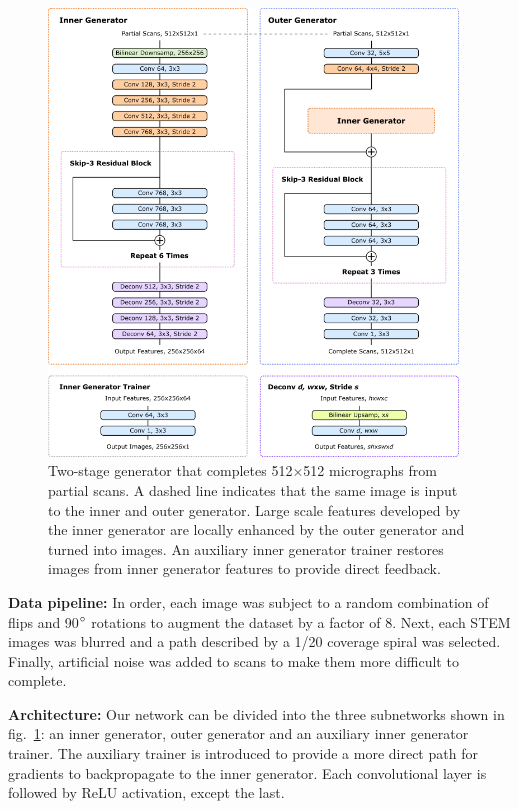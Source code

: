 \documentclass[letterpaper, 10 pt, conference]{ieeeconf}  %
\newcommand\extraspace{3pt}
\begin{document}
\begin{figure}[tbp!]
\vspace{1.5cm}
\centering
\includegraphics[width=0.97\textwidth]{gen-2-step.png}
\caption{ Two-stage generator that completes 512$\times$512 micrographs from partial scans. A dashed line indicates that the same image is input to the inner and outer generator. Large scale features developed by the inner generator are locally enhanced by the outer generator and turned into images. An auxiliary inner generator trainer restores images from inner generator features to provide direct feedback. }
\label{gen-2-step}
\vspace{1.5cm}
\end{figure}


\vspace{\extraspace}
\noindent\textbf{Data pipeline:} In order, each image was subject to a random combination of flips and 90$\degree$ rotations to augment the dataset by a factor of 8. Next, each STEM images was blurred and a path described by a 1/20 coverage spiral was selected. Finally, artificial noise was added to scans to make them more difficult to complete.

\vspace{\extraspace}
\noindent\textbf{Architecture:} Our network can be divided into the three subnetworks shown in fig.~\ref{gen-2-step}: an inner generator, outer generator and an auxiliary inner generator trainer. The auxiliary trainer\cite{szegedy2014going, szegedy2015rethinking} is introduced to provide a more direct path for gradients to backpropagate to the inner generator. Each convolutional layer is followed by ReLU activation, except the last.
\end{document}
